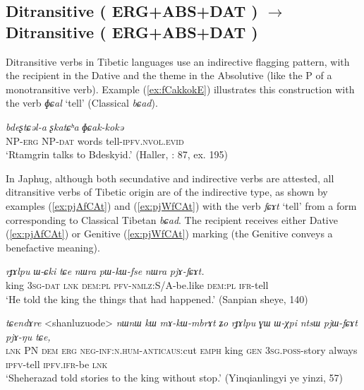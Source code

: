 \documentclass[oneside,a4paper,11pt]{article}
\makeatletter
\newcommand{\ipa}[1]{{\phon\textit{\mbox{#1}}}} %
\newcommand{\refb}[1]{(\ref{#1})}
\def\fakesc#1{%
  \begingroup%
  \xdef\fake@name{\csname\curr@fontshape/\f@size\endcsname}%
  \fontsize{\fontdimen8\fake@name}{\baselineskip}\selectfont%
  \uppercase{#1}%
  \endgroup%
}
\makeatother
\begin{document}
  \subsection{Ditransitive (\fakesc{erg+abs+dat})  $\rightarrow$ Ditransitive (\fakesc{erg+abs+dat})}
Ditransitive verbs in Tibetic languages use an indirective flagging pattern, with the recipient in the Dative and the theme in the Absolutive (like the P of a monotransitive verb). Example \refb{ex:fCakkokE} illustrates this construction with the verb \ipa{ɸɕal} `tell' (Classical \ipa{bɕad}).

\begin{exe}
\ex \label{ex:fCakkokE}
\gll \ipa{ʂtamɖʐən-ɣə}  \ipa{bdeʂtɕəl-a} \ipa{ʂkatɕʰa} \ipa{ɸɕak-kokə} \\
NP-\textsc{erg} NP-\textsc{dat} words tell-\textsc{ipfv.nvol.evid} \\
\glt `Rtamgrin talks to Bdeskyid.' (Haller, \citeyear{haller04themchen}: 87, ex. 195)
\end{exe}

In Japhug, although both secundative and indirective verbs are attested, all ditransitive verbs of Tibetic origin are of the indirective type, as shown by examples \refb{ex:pjAfCAt} and \refb{ex:pjWfCAt} with the verb \ipa{fɕɤt} `tell' from a form corresponding to Classical Tibetan \ipa{bɕad}. The recipient receives either Dative (\ref{ex:pjAfCAt}) or Genitive (\ref{ex:pjWfCAt}) marking (the Genitive conveys a benefactive meaning).

\begin{exe}
\ex \label{ex:pjAfCAt}
\gll
  \ipa{rɟɤlpu} 	\ipa{ɯ-ɕki} 	\ipa{tɕe} 	\ipa{nɯra} 	\ipa{pɯ-kɯ-fse} 	\ipa{nɯra} 	\ipa{pjɤ-fɕɤt.} \\
  king \textsc{3sg-dat} \textsc{lnk} \textsc{dem:pl} \textsc{pfv-nmlz}:S/A-be.like  \textsc{dem:pl} \textsc{ifr}-tell \\
  \glt `He told the king the things that had happened.' (Sanpian sheye, 140)
\end{exe}

\begin{exe}
\ex \label{ex:pjWfCAt}
\gll
  \ipa{tɕendɤre} 	<shanluzuode> 	\ipa{nɯnɯ} 	\ipa{kɯ} 	\ipa{mɤ-kɯ-mbrɤt} 	\ipa{ʑo} 	\ipa{rɟɤlpu} 	\ipa{ɣɯ} 	\ipa{ɯ-χpi} 	\ipa{ntsɯ} 	\ipa{pjɯ-fɕɤt} 	\ipa{pjɤ-ŋu} 	\ipa{tɕe,} \\
  \textsc{lnk} PN \textsc{dem} \textsc{erg} \textsc{neg-inf:n.hum}-\textsc{anticaus}:cut \textsc{emph} king \textsc{gen} \textsc{3sg.poss}-story always \textsc{ipfv}-tell \textsc{ipfv.ifr}-be \textsc{lnk} \\
\glt `Sheherazad told stories to the king without stop.' (Yinqianlingyi ye yinzi, 57)
\end{exe}
\end{document}

